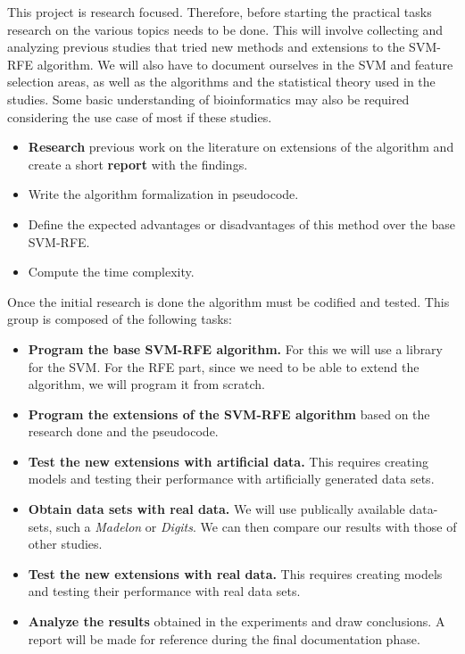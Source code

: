 This project is research focused. Therefore, before starting the practical tasks research on the various topics needs to be done. This will involve collecting and analyzing previous studies that tried new methods and extensions to the SVM-RFE algorithm. We will also have to document ourselves in the SVM and feature selection areas, as well as the algorithms and the statistical theory used in the studies. Some basic understanding of bioinformatics may also be required considering the use case of most if these studies.

\begin{itemize}
    \item \textbf{Research} previous work on the literature on extensions of the algorithm and create a short \textbf{report} with the findings.
    \item Write the algorithm formalization in pseudocode.
    \item Define the expected advantages or disadvantages of this method over the base SVM-RFE.
    \item Compute the time complexity.
\end{itemize}

Once the initial research is done the algorithm must be codified and tested. This group is composed of the following tasks:

\begin{itemize}
    \item \textbf{Program the base SVM-RFE algorithm.} For this we will use a library for the SVM. For the RFE part, since we need to be able to extend the algorithm, we will program it from scratch.
    \item \textbf{Program the extensions of the SVM-RFE algorithm} based on the research done and the pseudocode.
    \item \textbf{Test the new extensions with artificial data.} This requires creating models and testing their performance with artificially generated data sets.
    \item \textbf{Obtain data sets with real data.} We will use publically available data-sets, such a \emph{Madelon} or \emph{Digits}. We can then compare our results with those of other studies.
    \item \textbf{Test the new extensions with real data.} This requires creating models and testing their performance with real data sets.
    \item \textbf{Analyze the results} obtained in the experiments and draw conclusions. A report will be made for reference during the final documentation phase.
\end{itemize}

